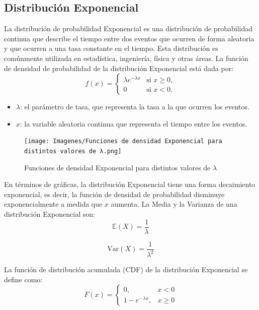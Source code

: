 \documentclass{article}
\begin{document}
\subsection{Distribución Exponencial}
 La distribución de probabilidad Exponencial es una distribución de probabilidad continua que describe el tiempo entre dos eventos que ocurren de forma aleatoria y que ocurren a una tasa constante en el tiempo. Esta distribución es comúnmente utilizada en estadística, ingeniería, física y otras áreas. La función de densidad de probabilidad de la distribución Exponencial está dada por:
\begin{equation}
       f(x) = 
    \begin{cases}
    \lambda e^{-\lambda x} & \text{si } x \geq 0, \\
    0 & \text{si } x < 0.
    \end{cases}
\end{equation}
\begin{itemize}
    \item $\lambda$: el parámetro de tasa, que representa la tasa a la que ocurren los eventos.
    \item $x$: la variable aleatoria continua que representa el tiempo entre los eventos.
\end{itemize}

\begin{figure}[H]
    \centering
    \texttt{[image: Imagenes/Funciones de densidad Exponencial para distintos valores de λ.png]}
    \caption{Funciones de densidad Exponencial para distintos valores de $\lambda$}
    \label{fig:Dist.Exponencial}
\end{figure}
En términos de gráficas, la distribución Exponencial tiene una forma decaimiento exponencial, es decir, la función de densidad de probabilidad disminuye exponencialmente a medida que $x$ aumenta.
La Media y la Varianza de una distribución Exponencial son:
\begin{equation}
    \mathbb{E}(X) = \frac{1}{\lambda}
\end{equation}

\begin{equation}
    \mathrm{Var}(X) = \frac{1}{\lambda^2}
\end{equation}

La función de distribución acumulada (CDF) de la distribución Exponencial se define como:
\begin{equation}
    F(x) = 
    \begin{cases}
    0, & x < 0 \\
    1 - e^{-\lambda x}, & x \geq 0
    \end{cases}
\end{equation}
\end{document}
